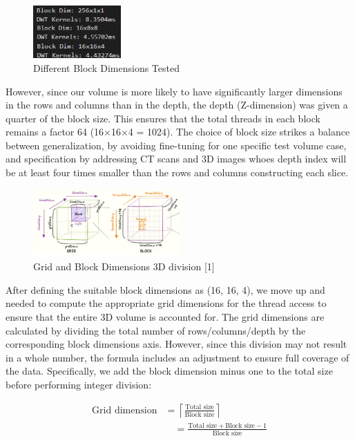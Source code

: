 \documentclass[journal,11pt]{IEEEtran}
\begin{document}
\begin{figure}[h]
    \centering
    \includegraphics[width=0.3\textwidth]{assets/block-dims.png}
    \caption{Different Block Dimensions Tested}
    \label{fig:2}
\end{figure}
However, since our volume is more likely to have significantly larger dimensions in the rows and columns than in the depth, the depth (Z-dimension) was given a quarter of the block size. This ensures that the total threads in each block remains a factor 64 (16×16×4 = 1024). The choice of block size strikes a balance between generalization, by avoiding fine-tuning for one specific test volume case, and specification by addressing CT scans and 3D images whoes depth index will be at least four times smaller than the rows and columns constructing each slice.
\begin{figure}[h]
    \centering
    \includegraphics[width=0.5\textwidth]{assets/grid_block.png}
    \caption{Grid and Block Dimensions 3D division [1]}
    \label{fig:3}
\end{figure}
After defining the suitable block dimensions as (16, 16, 4), we move up and needed to compute the appropriate grid dimensions for the thread access to ensure that the entire 3D volume is accounted for. The grid dimensions are calculated by dividing the total number of rows/columns/depth by the corresponding block dimensions axis. However, since this division may not result in a whole number, the formula includes an adjustment to ensure full coverage of the data. Specifically, we add the block dimension minus one to the total size before performing integer division:

\begin{equation}
    \begin{aligned}
        \text{Grid dimension} &= \left\lceil \frac{\text{Total size}}{\text{Block size}} \right\rceil \\
        &\quad = \frac{\text{Total size} + \text{Block size} - 1}{\text{Block size}}
    \end{aligned}
\end{equation}
\\
\end{document}
